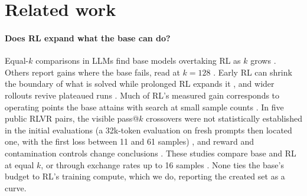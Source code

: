 \section{Related work}
\label{sec:related}

\paragraph{Does RL expand what the base can do?} Equal-$k$ comparisons in LLMs find base models overtaking RL as $k$
grows \citep{yue2025doesrl}. Others report gains where the base fails, read at $k=128$ \citep{liu2025prorl}. Early RL can
shrink the boundary of what is solved while prolonged RL expands it \citep{yao2025twostage}, and wider rollouts revive
plateaued runs \citep{hu2025brorl}. Much of RL's measured gain corresponds to operating points the base attains with
search at small sample counts \citep{sun2026budgeted}. In five public RLVR pairs, the visible pass@$k$ crossovers were not statistically
established in the initial evaluations (a 32k-token evaluation on fresh prompts then located one, with the first
loss between 11 and 61 samples) \citep{yang2026kernel}, and reward and contamination controls change conclusions
\citep{shao2025spurious,wu2025contamination}. These studies compare base and RL at equal $k$, or through exchange rates
up to 16 samples \citep{sun2026budgeted}. None ties the base's budget to RL's training compute, which we do, reporting
the created set as a curve.


